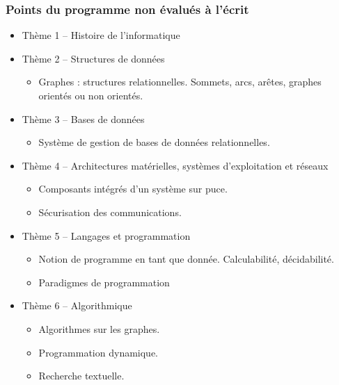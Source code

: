 \documentclass[
  a4paper,
  DIV=11,
  numbers=noendperiod]{scrartcl}
\providecommand{\tightlist}{%
  \setlength{\itemsep}{0pt}\setlength{\parskip}{0pt}}\usepackage{longtable,booktabs,array}
\begin{document}
\hypertarget{points-du-programme-non-uxe9valuuxe9s-uxe0-luxe9crit}{%
\subsubsection{Points du programme non évalués à
l'écrit}\label{points-du-programme-non-uxe9valuuxe9s-uxe0-luxe9crit}}

\begin{itemize}
\item
  Thème 1 -- Histoire de l'informatique
\item
  Thème 2 -- Structures de données

  \begin{itemize}
  \tightlist
  \item
    Graphes : structures relationnelles. Sommets, arcs, arêtes, graphes
    orientés ou non orientés.
  \end{itemize}
\item
  Thème 3 -- Bases de données

  \begin{itemize}
  \tightlist
  \item
    Système de gestion de bases de données relationnelles.
  \end{itemize}
\item
  Thème 4 -- Architectures matérielles, systèmes d'exploitation et
  réseaux

  \begin{itemize}
  \tightlist
  \item
    Composants intégrés d'un système sur puce.
  \item
    Sécurisation des communications.
  \end{itemize}
\item
  Thème 5 -- Langages et programmation

  \begin{itemize}
  \tightlist
  \item
    Notion de programme en tant que donnée. Calculabilité, décidabilité.
  \item
    Paradigmes de programmation
  \end{itemize}
\item
  Thème 6 -- Algorithmique

  \begin{itemize}
  \tightlist
  \item
    Algorithmes sur les graphes.
  \item
    Programmation dynamique.
  \item
    Recherche textuelle.
  \end{itemize}
\end{itemize}
\end{document}
